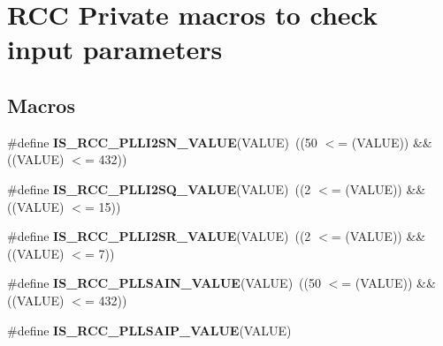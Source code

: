 \hypertarget{group___r_c_c_ex___i_s___r_c_c___definitions}{}\section{R\+CC Private macros to check input parameters}
\label{group___r_c_c_ex___i_s___r_c_c___definitions}
\subsection*{Macros}
\begin{DoxyCompactItemize}
\item 
\mbox{\label{group___r_c_c_ex___i_s___r_c_c___definitions_gac30fb7f6fe9f22a7d6c5585909db5c3c}} 
\#define {\bfseries I\+S\+\_\+\+R\+C\+C\+\_\+\+P\+L\+L\+I2\+S\+N\+\_\+\+V\+A\+L\+UE}(V\+A\+L\+UE)~((50 $<$= (V\+A\+L\+UE)) \&\& ((V\+A\+L\+UE) $<$= 432))
\item 
\mbox{\label{group___r_c_c_ex___i_s___r_c_c___definitions_gafedb34faed940069eb7485776e5875c5}} 
\#define {\bfseries I\+S\+\_\+\+R\+C\+C\+\_\+\+P\+L\+L\+I2\+S\+Q\+\_\+\+V\+A\+L\+UE}(V\+A\+L\+UE)~((2 $<$= (V\+A\+L\+UE)) \&\& ((V\+A\+L\+UE) $<$= 15))
\item 
\mbox{\label{group___r_c_c_ex___i_s___r_c_c___definitions_gaa2fece4b24f6219b423e1b092b7705c8}} 
\#define {\bfseries I\+S\+\_\+\+R\+C\+C\+\_\+\+P\+L\+L\+I2\+S\+R\+\_\+\+V\+A\+L\+UE}(V\+A\+L\+UE)~((2 $<$= (V\+A\+L\+UE)) \&\& ((V\+A\+L\+UE) $<$= 7))
\item 
\mbox{\label{group___r_c_c_ex___i_s___r_c_c___definitions_ga400e5231409376eba690f252db7b2a19}} 
\#define {\bfseries I\+S\+\_\+\+R\+C\+C\+\_\+\+P\+L\+L\+S\+A\+I\+N\+\_\+\+V\+A\+L\+UE}(V\+A\+L\+UE)~((50 $<$= (V\+A\+L\+UE)) \&\& ((V\+A\+L\+UE) $<$= 432))
\item 
\#define {\bfseries I\+S\+\_\+\+R\+C\+C\+\_\+\+P\+L\+L\+S\+A\+I\+P\+\_\+\+V\+A\+L\+UE}(V\+A\+L\+UE)
\item 
\mbox{\label{group___r_c_c_ex___i_s___r_c_c___definitions_ga505ad7125d7fbf79e8520912e4bbd761}} 

\end{DoxyCompactItemize}

